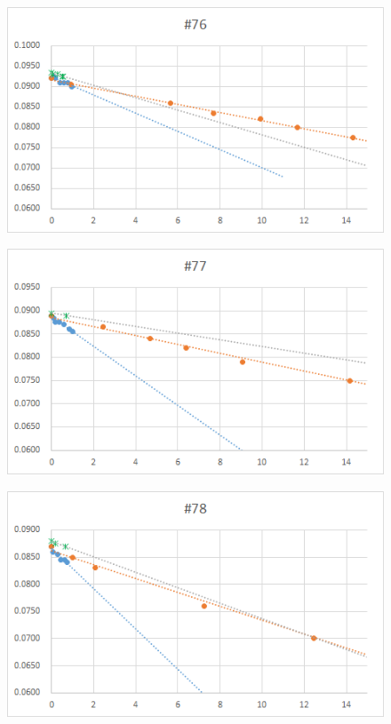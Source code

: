   \begin{figure}[htbp]
    \centering
       \includegraphics[width=120mm]{vol_076.png}
  \end{figure}
  \begin{figure}[htbp]
    \centering
       \includegraphics[width=120mm]{vol_077.png}
  \end{figure}
  \begin{figure}[htbp]
    \centering
       \includegraphics[width=120mm]{vol_078.png}
  \end{figure}
